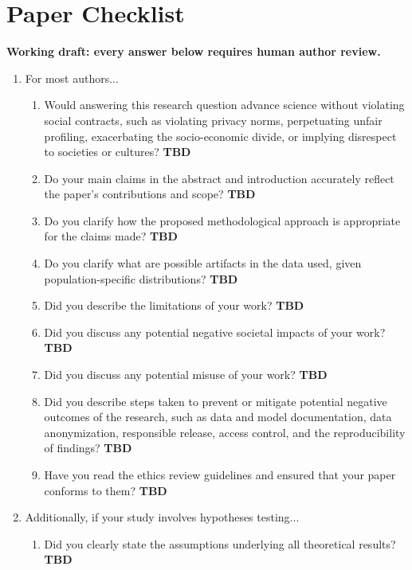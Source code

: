 \section*{Paper Checklist}
\noindent\textbf{Working draft: every answer below requires human author review.}
\newcommand{\ChecklistTBD}{\textbf{TBD}}
\begin{enumerate}
\item For most authors...
\begin{enumerate}
\item Would answering this research question advance science without violating social contracts, such as violating privacy norms, perpetuating unfair profiling, exacerbating the socio-economic divide, or implying disrespect to societies or cultures? \ChecklistTBD
\item Do your main claims in the abstract and introduction accurately reflect the paper's contributions and scope? \ChecklistTBD
\item Do you clarify how the proposed methodological approach is appropriate for the claims made? \ChecklistTBD
\item Do you clarify what are possible artifacts in the data used, given population-specific distributions? \ChecklistTBD
\item Did you describe the limitations of your work? \ChecklistTBD
\item Did you discuss any potential negative societal impacts of your work? \ChecklistTBD
\item Did you discuss any potential misuse of your work? \ChecklistTBD
\item Did you describe steps taken to prevent or mitigate potential negative outcomes of the research, such as data and model documentation, data anonymization, responsible release, access control, and the reproducibility of findings? \ChecklistTBD
\item Have you read the ethics review guidelines and ensured that your paper conforms to them? \ChecklistTBD
\end{enumerate}
\item Additionally, if your study involves hypotheses testing...
\begin{enumerate}
\item Did you clearly state the assumptions underlying all theoretical results? \ChecklistTBD

\end{enumerate}
\end{enumerate}
